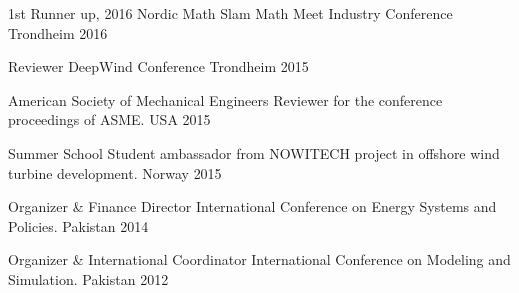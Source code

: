 

\begin{cvhonors}

   \cvhonor
   {1st Runner up, 2016 Nordic Math Slam} %
   {Math Meet Industry Conference} %
   {Trondheim} %
   {2016} %



   \cvhonor
   {Reviewer} %
   {DeepWind Conference} %
   {Trondheim} %
   {2015} %
 
  \cvhonor
    {American Society of Mechanical Engineers} %
    {Reviewer for the conference proceedings of ASME.} %
    {USA} %
    {2015} %

  \cvhonor
    {Summer School} %
    {Student ambassador from NOWITECH project in offshore wind turbine development.} %
    {Norway} %
    {2015} %

  \cvhonor
  {Organizer \& Finance Director} %
  {International Conference on Energy Systems and Policies.} %
  {Pakistan} %
  {2014} %
  

  \cvhonor
  {Organizer \& International Coordinator} %
  {International Conference on Modeling and Simulation.} %
  {Pakistan} %
  {2012} %
  
\end{cvhonors}
